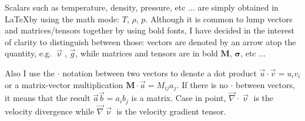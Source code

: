 Scalars such as temperature, density, pressure, etc ... are simply 
obtained in \LaTeX by using the math mode: $T$, $\rho$, $p$.
Although it is common to lump vectors and matrices/tensors together
by using bold fonts, I have decided in the interest of clarity to 
distinguish between those: vectors are denoted by an arrow 
atop the quantity, e.g. $\vec \upnu$, $\vec g$, while matrices 
and tensors are in bold $\bm M$, $\bm \sigma$, etc ...

Also I use the $\cdot$ notation between two vectors to denote a 
dot product $\vec u \cdot \vec v = u_iv_i$ or a matrix-vector
multiplication ${\bm M}\cdot \vec a = M_{ij}a_j$. If there is no
$\cdot$ between vectors, it means that the result 
$\vec a \vec b = a_ib_j$ is a matrix.
Case in point, $\vec\nabla\cdot\vec\upnu$ is the velocity divergence
while $\vec\nabla\vec\upnu$ is the velocity gradient tensor.
